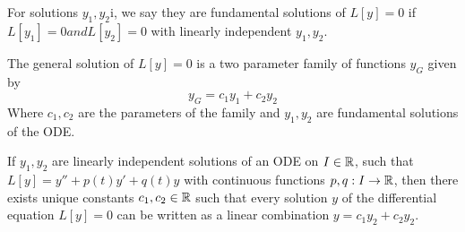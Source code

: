 \begin{definition}
  For solutions $y_1,y_2$i, we say they are fundamental solutions of $L[y]=0$ if $L[y_1]=0
  and L[y_2]=0$ with linearly independent $y_1, y_2$.
  \label{fundamentalSolutions}
\end{definition}
\begin{definition}
  The general solution of $L[y]=0$ is a two parameter family of functions $y_G$ given by 
  \[y_G = c_1 y_1 + c_2 y_2\]
  Where $c_1,c_2$ are the parameters of the family and $y_1,y_2$ are fundamental
  solutions of the ODE.
  \label{generalSolution}
\end{definition}
\begin{theorem}
  If $y_1,y_2$ are linearly independent solutions of an ODE on $I\in\mathbb R$, such that
  $L[y]=y''+p(t)y'+q(t)y$ with continuous functions $p,q:I\to \mathbb R$, then there exists
  unique constants $c_1,c_2\in\mathbb R$ such that every solution $y$ of the differential
  equation $L[y]=0$ can be written as a linear combination $y= c_1y_2 +c_2 y_2$.
\end{theorem}
